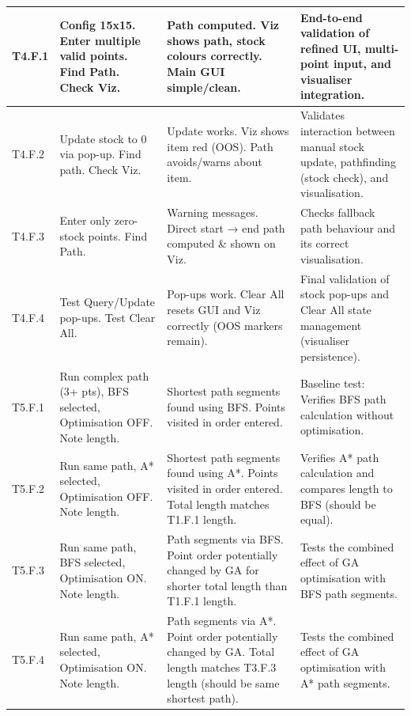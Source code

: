 \begin{longtable}{|p{}|p{}|p{}|p{}|}

T4.F.1 & Config 15x15. Enter multiple valid points. Find Path. Check Viz. & Path computed. Viz shows path, stock colours correctly. Main GUI simple/clean. & End-to-end validation of refined UI, multi-point input, and visualiser integration. \\
\hline
T4.F.2 & Update stock to 0 via pop-up. Find path. Check Viz. & Update works. Viz shows item red (OOS). Path avoids/warns about item. & Validates interaction between manual stock update, pathfinding (stock check), and visualisation. \\
\hline
T4.F.3 & Enter only zero-stock points. Find Path. & Warning messages. Direct start → end path computed \& shown on Viz. & Checks fallback path behaviour and its correct visualisation. \\
\hline
T4.F.4 & Test Query/Update pop-ups. Test Clear All. & Pop-ups work. Clear All resets GUI and Viz correctly (OOS markers remain). & Final validation of stock pop-ups and Clear All state management (visualiser persistence). \\
\hline

T5.F.1 & Run complex path (3+ pts), BFS selected, Optimisation OFF. Note length. & Shortest path segments found using BFS. Points visited in order entered. & Baseline test: Verifies BFS path calculation without optimisation. \\
\hline
T5.F.2 & Run same path, A* selected, Optimisation OFF. Note length. & Shortest path segments found using A*. Points visited in order entered. Total length matches T1.F.1 length. & Verifies A* path calculation and compares length to BFS (should be equal). \\ %
\hline
T5.F.3 & Run same path, BFS selected, Optimisation ON. Note length. & Path segments via BFS. Point order potentially changed by GA for shorter total length than T1.F.1 length. & Tests the combined effect of GA optimisation with BFS path segments. \\ %
\hline
T5.F.4 & Run same path, A* selected, Optimisation ON. Note length. & Path segments via A*. Point order potentially changed by GA. Total length matches T3.F.3 length (should be same shortest path). & Tests the combined effect of GA optimisation with A* path segments. \\ %
\hline


\end{longtable}
